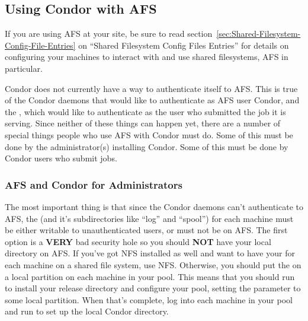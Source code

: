 \subsection{Using Condor with AFS}
\label{sec:Condor-AFS}

If you are using AFS at your site, be sure to read
section~\ref{sec:Shared-Filesystem-Config-File-Entries} on ``Shared
Filesystem Config Files Entries'' for details on configuring your
machines to interact with and use shared filesystems, AFS in
particular.

Condor does not currently have a way to authenticate itself to AFS.
This is true of the Condor daemons that would like to authenticate as
AFS user Condor, and the , which would like to
authenticate as the user who submitted the job it is serving.  Since
neither of these things can happen yet, there are a number of special
things people who use AFS with Condor must do.  Some of this must be
done by the administrator(s) installing Condor.  Some of this must be
done by Condor users who submit jobs.

\subsubsection{AFS and Condor for Administrators}
\label{sec:Condor-AFS-Admin}

The most important thing is that since the Condor daemons can't
authenticate to AFS, the  (and it's subdirectories
like ``log'' and ``spool'') for each machine must be either writable
to unauthenticated users, or must not be on AFS.  The first option is
a \textbf{VERY} bad security hole so you should \textbf{NOT} have your
local directory on AFS.  If you've got NFS installed as well and want
to have your  for each machine on a shared file
system, use NFS.  Otherwise, you should put the  on
a local partition on each machine in your pool.  This means that you
should run  to install your release directory and
configure your pool, setting the  parameter to some
local partition.  When that's complete, log into each machine in your
pool and run  to set up the local Condor directory.

